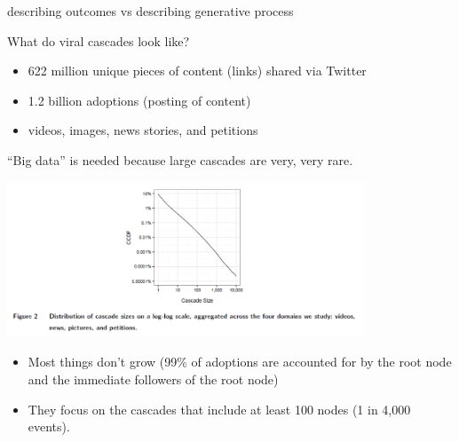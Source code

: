 \documentclass[aspectratio=169]{beamer}
\begin{document}
\begin{frame}

describing outcomes vs describing generative process 

\end{frame}
\begin{frame}

What do viral cascades look like?

\begin{itemize}
\item 622 million unique pieces of content (links) shared via Twitter
\item 1.2 billion adoptions (posting of content)
\item videos, images, news stories, and petitions
\end{itemize}

``Big data'' is needed because large cascades are very, very rare.

\end{frame}
\begin{frame}

\begin{center}
\includegraphics[width=0.8\textwidth]{figures/goel_structural_2016_fig2}
\end{center}

\begin{itemize}
\item Most things don't grow (99\% of adoptions are accounted for by the root node and the immediate followers of the root node) \pause
\item They focus on the cascades that include at least 100 nodes (1 in 4,000 events).
\end{itemize}

\end{frame}
\end{document}
